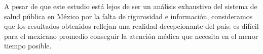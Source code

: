 \documentclass[10pt]{article}
\begin{document}
    A pesar de que este estudio está lejos de ser un análisis exhaustivo del sistema de salud pública en México por la falta de rigurosidad e información, consideramos que los resultados obtenidos reflejan una realidad decepcionante del país: es difícil para el mexicano promedio conseguir la atención médica que necesita en el menor tiempo posible.
    
    \newpage
    
    
    
\end{document}
